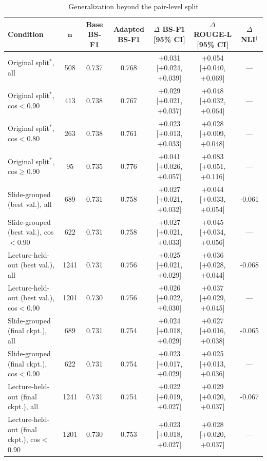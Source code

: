 \begin{table}[!htbp]
\centering
\caption{Generalization beyond the pair-level split}
\label{tab:sup_splits}
\footnotesize
\setlength{\tabcolsep}{3pt}
\begin{tabular}{lcccccc}
\toprule
\textbf{Condition} & $\boldsymbol{n}$ & \textbf{Base BS-F1} & \textbf{Adapted BS-F1} & \textbf{$\Delta$ BS-F1 [95\% CI]} & \textbf{$\Delta$ ROUGE-L [95\% CI]} & \textbf{$\Delta$ NLI$^\dagger$} \\
\midrule
Original split$^*$, all & 508 & 0.737 & 0.768 & +0.031 [+0.024, +0.039] & +0.054 [+0.040, +0.069] & --- \\
Original split$^*$, cos$<$0.90 & 413 & 0.738 & 0.767 & +0.029 [+0.021, +0.037] & +0.048 [+0.032, +0.064] & --- \\
Original split$^*$, cos$<$0.80 & 263 & 0.738 & 0.761 & +0.023 [+0.013, +0.033] & +0.028 [+0.009, +0.048] & --- \\
Original split$^*$, cos$\geq$0.90 & 95 & 0.735 & 0.776 & +0.041 [+0.026, +0.057] & +0.083 [+0.051, +0.116] & --- \\
Slide-grouped (best val.), all & 689 & 0.731 & 0.758 & +0.027 [+0.021, +0.032] & +0.044 [+0.033, +0.054] & -0.061 \\
Slide-grouped (best val.), cos$<$0.90 & 622 & 0.731 & 0.758 & +0.027 [+0.021, +0.033] & +0.045 [+0.034, +0.056] & --- \\
Lecture-held-out (best val.), all & 1241 & 0.731 & 0.756 & +0.025 [+0.021, +0.029] & +0.036 [+0.028, +0.044] & -0.068 \\
Lecture-held-out (best val.), cos$<$0.90 & 1201 & 0.730 & 0.756 & +0.026 [+0.022, +0.030] & +0.037 [+0.029, +0.045] & --- \\
Slide-grouped (final ckpt.), all & 689 & 0.731 & 0.754 & +0.024 [+0.018, +0.029] & +0.027 [+0.016, +0.038] & -0.065 \\
Slide-grouped (final ckpt.), cos$<$0.90 & 622 & 0.731 & 0.754 & +0.023 [+0.017, +0.029] & +0.025 [+0.013, +0.036] & --- \\
Lecture-held-out (final ckpt.), all & 1241 & 0.731 & 0.754 & +0.022 [+0.019, +0.027] & +0.029 [+0.020, +0.037] & -0.067 \\
Lecture-held-out (final ckpt.), cos$<$0.90 & 1201 & 0.730 & 0.753 & +0.023 [+0.018, +0.027] & +0.028 [+0.020, +0.037] & --- \\
\bottomrule
\end{tabular}
\end{table}
